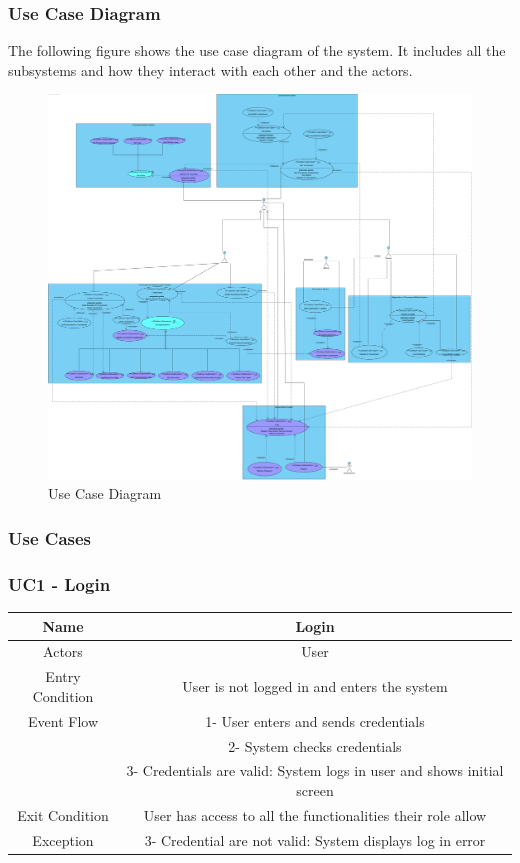 \documentclass{article}
\begin{document}
\subsubsection{Use Case Diagram}

The following figure shows the use case diagram of the system. It includes all the subsystems and how they interact with each other and
the actors.

\begin{figure}[!h]
    \centering
    \includegraphics[width=1\textwidth]{images/UseCaseDiagram}
    \caption{Use Case Diagram}
    \label{fig:UseCaseDiagram}
\end{figure}

\subsubsection{Use Cases}

\subsubsection*{UC1 - Login}

\setlength\tabcolsep{0pt}
\begin{tabular*}{\linewidth}{@{\extracolsep{\fill}} cc }
    \hline
    Name & Login \\ 
    \hline
    Actors & User \\ 
    \hline
    Entry Condition & User is not logged in and enters the system \\ 
    \hline
    Event Flow & 1- User enters and sends credentials\\ 
               & 2- System checks credentials\\
               & 3- Credentials are valid: System logs in user and shows initial screen\\
    \hline
    Exit Condition & User has access to all the functionalities their role allow\\ 
    \hline
    Exception & 3- Credential are not valid: System displays log in error\\ 
    \hline
\end{tabular*}
\end{document}
